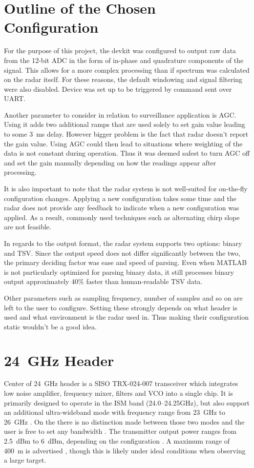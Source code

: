 \section{Outline of the Chosen Configuration }


For the purpose of this project, the devkit was configured to output raw data from the 12-bit ADC in the form of in-phase and quadrature components of the signal.
This allows for a more complex processing than if spectrum was calculated on the radar itself.
For these reasons, the default windowing and signal filtering were also disabled.
Device was set up to be triggered by command sent over UART.

Another parameter to consider in relation to surveillance application is AGC.
Using it adds two additional ramps that are used solely to set gain value leading to some 3~ms delay.
However bigger problem is the fact that radar doesn't report the gain value.
Using AGC could then lead to situations where weighting of the data is not constant during operation.
Thus it was deemed safest to turn AGC off and set the gain manually depending on how the readings appear after processing.

It is also important to note that the radar system is not well-suited for on-the-fly configuration changes.
Applying a new configuration takes some time  and the radar does not provide any feedback to indicate when a new configuration was applied.
As a result, commonly used techniques such as alternating chirp slope are not feasible.

In regards to the output format, the radar system supports two options: binary and TSV.
Since the output speed does not differ significantly between the two, the primary deciding factor was ease and speed of parsing.
Even when MATLAB is not particularly optimized for parsing binary data, it still processes binary output approximately 40\% faster than human-readable TSV data.

Other parameters such as sampling frequency, number of samples and so on are left to the user to configure.
Setting these strongly depends on what header is used and what environment is the radar used in.
Thus making their configuration static wouldn't be a good idea.


\section{24~GHz Header}

Center of 24~GHz header is a SISO TRX-024-007 transceiver which integrates low noise amplifier, frequency mixer, filters and VCO into a single chip.
It is primarily designed to operate in the ISM band (24.0--24.25GHz), but also support an additional ultra-wideband mode with frequency range from 23~GHz to 26~GHz \cite{sidarTRX24}.
On the \sidar there is no distinction made between  those two modes and the user is free to set any bandwidth \cite{sidarPRO} .
The transmitter output power ranges from 2.5~dBm to 6~dBm, depending on the configuration \cite{sidarTRX24}.
A maximum range of 400~m is advertised \cite{sidarMANOld}, though this is likely under ideal conditions when observing a large target.

